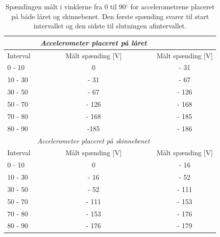 \begin{table}[]
\centering
\begin{tabular}{lcc}
         & \textit{Accelerometer placeret på låret}                           & \multicolumn{1}{l}{}                      \\ \hline
Interval & Målt spænding {[}V{]}                                              & \multicolumn{1}{l}{Målt spænding {[}V{]}} \\ \hline
0 - 10   & 0                                                                  & - 31                                      \\ \hline
10 - 30  & - 31                                                               & - 67                                      \\ \hline
30 - 50  & - 67                                                               & - 126                                     \\ \hline
50 - 70  & - 126                                                              & - 168                                     \\ \hline
70 - 80  & - 168                                                              & - 185                                     \\
\hline
80 - 90  & -185                                                               & - 186                                     \\
\hline
         & \multicolumn{1}{l}{\textit{Accelerometer placeret på skinnebenet}} & \multicolumn{1}{l}{}                      \\ \hline
Interval & Målt spænding {[}V{]}                                              & \multicolumn{1}{l}{Målt spænding {[}V{]}} \\ \hline
0 - 10   & 0                                                                  & - 16                                      \\
\hline
10 - 30  & - 16                                                               & - 52                                      \\
\hline
30 - 50  & - 52                                                               & - 111                                     \\
\hline
50 - 70  & - 111                                                              & - 153                                     \\
\hline
70 - 80  & - 153                                                              & - 176                                     \\
\hline
80 - 90  & - 176                                                              & - 179    \\ \hline 
\end{tabular}
\caption{Spændingen målt i vinklerne fra 0 til 90$^{\circ}$ for accelerometrene placeret på både låret og skinnebenet. Den første spænding svarer til start intervallet og den sidste til slutningen afintervallet.}
\label{tab:vinkelinterval_psoc}        
\end{table}

